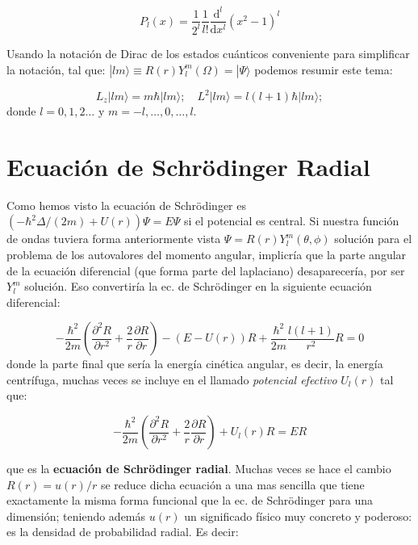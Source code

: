 \documentclass[12pt]{article}
\newcommand{\parentesis}[1]{\left( #1  \right)}
\newcommand{\parciales}[2]{\frac{\partial #1}{\partial #2}}
\newcommand{\D}{\mathrm{d}}
\newcommand{\derivadas}[2]{\frac{\D #1}{\D #2}}
\begin{document}
\begin{equation}
P_l (x) = \dfrac{1}{2^l} \dfrac{1}{l!} \derivadas{^l}{x^l} (x^2-1)^l
\end{equation}

Usando la notación de Dirac de los estados cuánticos conveniente para simplificar la notación, tal que: $| lm \rangle \equiv R(r) Y_l^m (\Omega) = | \Psi \rangle$ podemos resumir este tema:

\begin{equation}
L_z |lm\rangle = m \hbar |lm\rangle; \quad L^2 |lm\rangle = l(l+1) \hbar |lm\rangle; 
\end{equation}
donde $l=0,1,2\ldots$ y $m=-l,\ldots,0,\ldots,l$.

\section{Ecuación de Schrödinger Radial}

Como hemos visto la ecuación de Schrödinger es $(- \hbar^2 \Delta/(2m)  + U(r)) \Psi = E \Psi$ si el potencial es central. Si nuestra función de ondas tuviera forma anteriormente vista $\Psi = R(r) Y_l^m (\theta, \phi)$ solución para el problema de los autovalores del momento angular, implicría que la parte angular de la ecuación diferencial (que forma parte del laplaciano) desaparecería, por ser $Y_l^m$ solución. Eso convertiría la ec. de Schrödinger en la siguiente ecuación diferencial:

\begin{equation}
- \dfrac{\hbar^2}{2m}  \parentesis{\parciales{^2 R}{r^2} + \dfrac{2}{r} \parciales{R}{r}} - (E-U(r)) R + \dfrac{\hbar^2}{2m} \dfrac{l(l+1)}{r^2} R = 0
\end{equation}
donde la parte final  que sería la energía cinética angular, es decir, la energía centrífuga, muchas veces se incluye en el llamado \textit{potencial efectivo} $U_l (r)$ tal que:

\begin{equation}
- \dfrac{\hbar^2}{2m} \parentesis{\parciales{^2R}{r^2} + \dfrac{2}{r} \parciales{R}{r}} + U_l (r) R = E R
\end{equation}

que es la \textbf{ecuación de Schrödinger radial}. Muchas veces se hace el cambio $R(r)=u(r)/r$ se reduce dicha ecuación a una mas sencilla que tiene exactamente la misma forma funcional que la ec. de Schrödinger para una dimensión; teniendo además $u(r)$ un significado físico muy concreto y poderoso: es la densidad de probabilidad radial. Es decir:
\end{document}
